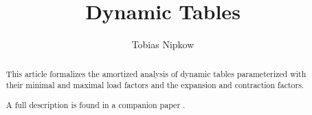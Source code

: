 \documentclass[11pt,a4paper]{article}
\begin{document}
\title{Dynamic Tables}
\author{Tobias Nipkow}
\maketitle

\begin{abstract}
  This article formalizes the amortized analysis of dynamic tables
  parameterized with their minimal and maximal load factors and the
  expansion and contraction factors.

  A full description is found in a companion paper \cite{Nipkow-Tables}.
\end{abstract}





\end{document}
